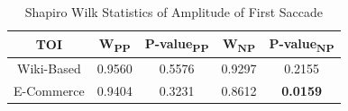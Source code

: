 \begin{table} [H]
    \centering
    \small
    \caption{Shapiro Wilk Statistics of Amplitude of First Saccade}
    \label{tab:afs_W_stats}
    \begin{tabular}{|c|c|c|c|c|}
        \hline
        \textbf{TOI} & \textbf{W\textsubscript{PP}} & \textbf{P-value\textsubscript{PP}} & \textbf{W\textsubscript{NP}} & \textbf{P-value\textsubscript{NP}} \\ \hline
        Wiki-Based & 0.9560 & 0.5576 & 0.9297 & 0.2155 \\ \hline
        E-Commerce & 0.9404 & 0.3231 & 0.8612 & \textbf{\color{red}0.0159} \\ \hline
    \end{tabular}
\end{table}

\begin{table}[H]
    \centering
    \small
    \setlength{\tabcolsep}{4pt}
    \caption{Statistics of Amplitude of First Saccade}
    \label{tab:afas_stats}
\end{table}

